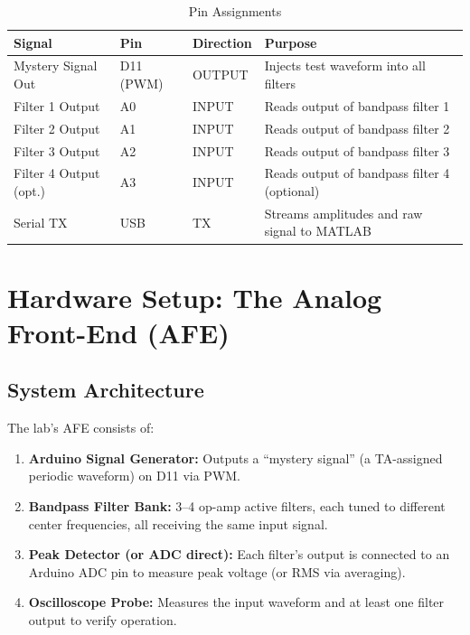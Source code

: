 \documentclass[11pt,letterpaper]{article}
\begin{document}
\begin{table}[H]
    \centering
    \caption{Pin Assignments}
    \label{tab:pins}
    \begin{tabularx}{\linewidth}{l l l X}
    \toprule
    \textbf{Signal} & \textbf{Pin} & \textbf{Direction} & \textbf{Purpose}\\
    \midrule
    Mystery Signal Out & D11 (PWM) & OUTPUT & Injects test waveform into all filters\\
    Filter 1 Output & A0 & INPUT & Reads output of bandpass filter 1\\
    Filter 2 Output & A1 & INPUT & Reads output of bandpass filter 2\\
    Filter 3 Output & A2 & INPUT & Reads output of bandpass filter 3\\
    Filter 4 Output (opt.) & A3 & INPUT & Reads output of bandpass filter 4 (optional)\\
    Serial TX & USB & TX & Streams amplitudes and raw signal to MATLAB\\
    \bottomrule
    \end{tabularx}
\end{table}

\clearpage

\section{Hardware Setup: The Analog Front-End (AFE)}

\subsection{System Architecture}

The lab's AFE consists of:

\begin{enumerate}
    \item \textbf{Arduino Signal Generator:} Outputs a ``mystery signal'' (a TA-assigned periodic waveform) on D11 via PWM.
    \item \textbf{Bandpass Filter Bank:} 3--4 op-amp active filters, each tuned to different center frequencies, all receiving the same input signal.
    \item \textbf{Peak Detector (or ADC direct):} Each filter's output is connected to an Arduino ADC pin to measure peak voltage (or RMS via averaging).
    \item \textbf{Oscilloscope Probe:} Measures the input waveform and at least one filter output to verify operation.
\end{enumerate}
\end{document}
